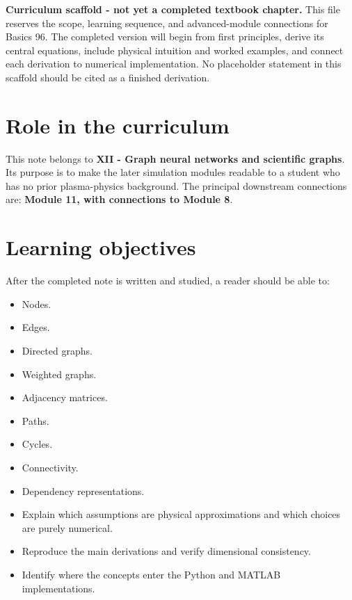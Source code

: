 \documentclass[11pt]{article}
\begin{document}

\begin{overviewbox}
\textbf{Curriculum scaffold - not yet a completed textbook chapter.} This file reserves the scope, learning sequence, and advanced-module connections for Basics 96. The completed version will begin from first principles, derive its central equations, include physical intuition and worked examples, and connect each derivation to numerical implementation. No placeholder statement in this scaffold should be cited as a finished derivation.
\end{overviewbox}

\ProjectTOC

\section{Role in the curriculum}
This note belongs to \textbf{XII - Graph neural networks and scientific graphs}. Its purpose is to make the later simulation modules readable to a student who has no prior plasma-physics background. The principal downstream connections are: \textbf{Module 11, with connections to Module 8}.

\section{Learning objectives}
After the completed note is written and studied, a reader should be able to:
\begin{itemize}[leftmargin=1.6em]
\item Nodes.
\item Edges.
\item Directed graphs.
\item Weighted graphs.
\item Adjacency matrices.
\item Paths.
\item Cycles.
\item Connectivity.
\item Dependency representations.
\item Explain which assumptions are physical approximations and which choices are purely numerical.
\item Reproduce the main derivations and verify dimensional consistency.
\item Identify where the concepts enter the Python and MATLAB implementations.
\end{itemize}
\end{document}
